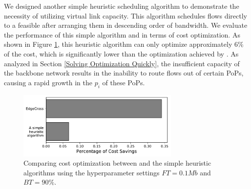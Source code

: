  We designed another simple heuristic scheduling algorithm to demonstrate the necessity of utilizing virtual link capacity. This algorithm schedules flows directly to a feasible {\egress} after arranging them in descending order of bandwidth. We evaluate the performance of this simple algorithm and {\sys} in terms of cost optimization. As shown in Figure \ref{fig:backboneEffect}, this heuristic algorithm can only optimize approximately 6\% of the cost, which is significantly lower than the optimization achieved by {\sys}. As analyzed in Section \ref{Solving Optimization Quickly}, the insufficient capacity of the backbone network results in the inability to route flows out of certain PoPs, causing a rapid growth in the {\egress} $p_i$ of these PoPs.

\begin{figure}
	\centering
	\includegraphics[width = 8cm]{figs/evaluation/backboneEffect.pdf}
	\caption{\small Comparing cost optimization between {\sys} and the simple heuristic algorithms using the hyperparameter settings $FT=0.1Mb$ and $BT=90\%$.}
	\label{fig:backboneEffect}
\end{figure}





